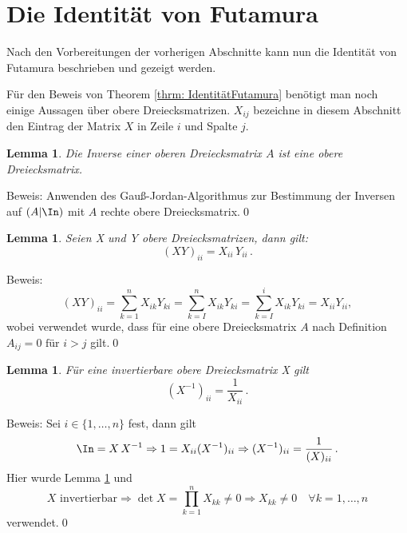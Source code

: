 \documentclass[a4paper,12pt]{report}
\newcommand{\inv}{^{-1}}
\newcommand{\1}{\mathds{1}}
\theoremstyle{plain} %
\newtheorem{lemma}[theorem]{Lemma}  %
\theoremstyle{definition} %
\theoremstyle{remark}
\begin{document}
      \section{Die Identität von Futamura}
      \label{sec: Futamura}

            Nach den Vorbereitungen der vorherigen Abschnitte kann nun die Identität von Futamura beschrieben und gezeigt werden.

            Für den Beweis von Theorem \ref{thrm: IdentitätFutamura} benötigt man noch einige Aussagen über obere Dreiecksmatrizen.
            $X_{ij}$ bezeichne in diesem Abschnitt den Eintrag der Matrix $X$ in Zeile $i$ und Spalte $j$.

            \begin{lemma}
                  \label{Hilfslemma_Futamura: Inv Dreieck}
                  Die Inverse einer oberen Dreiecksmatrix $A$ ist eine obere Dreiecksmatrix.
            \end{lemma}
            Beweis: Anwenden des Gauß-Jordan-Algorithmus zur Bestimmung der Inversen auf $(A|\In)$ mit $A$ rechte obere Dreiecksmatrix.\qed

            \begin{lemma}
                  \label{Hilfslemma_Futamura: Prod Dreieck}
                  Seien X und Y obere Dreiecksmatrizen, dann gilt:
                  $$(XY)_{ii} = X_{ii}\, Y_{ii}\, .$$
            \end{lemma}
            Beweis:
            $$(XY)_{ii} = \sum_{k=1}^n X_{ik}Y_{ki} = \sum_{k=I}^{n}X_{ik}Y_{ki} = \sum_{k=I}^{i}X_{ik}Y_{ki} = X_{ii} Y_{ii},$$
            wobei verwendet wurde, dass für eine obere Dreiecksmatrix $A$ nach Definition\linebreak
            ${A_{ij} = 0 \text{ für }i>j}$ gilt.\qed

            \begin{lemma}
                  \label{Hilfslemma_Futamura: Diag Inv Dreieck}
                  Für eine invertierbare obere Dreiecksmatrix X gilt
                  $$(X\inv)_{ii} = \frac 1 {X_{ii}}\,.$$
            \end{lemma}
            Beweis: Sei $i\in\{1,\dots,n\}$ fest, dann gilt
            $$\In = X\,X\inv \Rightarrow 1 = X_{ii}(X\inv)_{ii} \Rightarrow (X\inv)_{ii} = \frac 1 {(X)_{ii}}\,.$$
            Hier wurde Lemma \ref{Hilfslemma_Futamura: Prod Dreieck} und
            $$X \text{ invertierbar}\Rightarrow \det X = \prod_{k=1}^{n}X_{kk}\ne 0\Rightarrow X_{kk}\ne 0\quad \forall k=1,\dots,n$$
            verwendet.\qed\\
\end{document}
